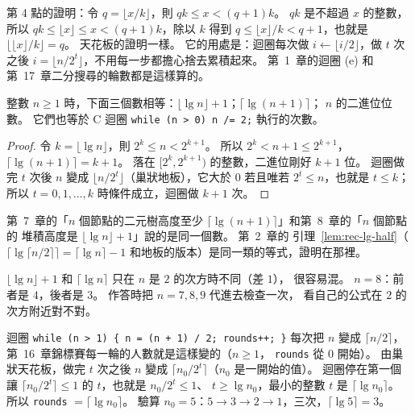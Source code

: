第 4 點的證明：令 $q = \lfloor x / k \rfloor$，則 $qk \le x < (q + 1)k$。 $qk$ 是不超過
$x$ 的整數，所以 $qk \le \lfloor x \rfloor \le x < (q + 1)k$，除以 $k$ 得到
$q \le \lfloor x \rfloor / k < q + 1$，也就是 $\lfloor \lfloor x \rfloor / k \rfloor = q$。
天花板的證明一樣。 它的用處是：迴圈每次做 $i \gets \lfloor i/2 \rfloor$，做 $t$ 次之後
$i = \lfloor n / 2^t \rfloor$，不用每一步都擔心捨去累積起來。 第~1~章的迴圈 (e) 和
第~17~章二分搜尋的輪數都是這樣算的。

\begin{lemma}
\label{lem:mth-bits}
整數 $n \ge 1$ 時，下面三個數相等：$\lfloor \lg n \rfloor + 1$；$\lceil \lg(n + 1) \rceil$；
$n$ 的二進位位數。 它們也等於 C 迴圈 \texttt{while (n > 0) n /= 2;} 執行的次數。
\end{lemma}

\begin{proof}
令 $k = \lfloor \lg n \rfloor$，則 $2^k \le n < 2^{k+1}$。 所以 $2^k < n + 1 \le 2^{k+1}$，
$\lceil \lg(n+1) \rceil = k + 1$。 落在 $[2^k, 2^{k+1})$ 的整數，二進位剛好 $k + 1$ 位。
迴圈做完 $t$ 次後 $n$ 變成 $\lfloor n / 2^t \rfloor$（巢狀地板），它大於 $0$ 若且唯若
$2^t \le n$，也就是 $t \le k$；所以 $t = 0, 1, \ldots, k$ 時條件成立，迴圈做 $k + 1$ 次。
\end{proof}

第~7~章的「$n$ 個節點的二元樹高度至少 $\lceil \lg(n+1) \rceil$」和第~8~章的「$n$ 個節點的
堆積高度是 $\lfloor \lg n \rfloor + 1$」說的是同一個數。 第~2~章的
引理~\ref{lem:rec-lg-half}（$\lceil \lg \lceil n/2 \rceil \rceil = \lceil \lg n \rceil - 1$
和地板的版本）是同一類的等式，證明在那裡。

\begin{examnote}
$\lfloor \lg n \rfloor + 1$ 和 $\lceil \lg n \rceil$ 只在 $n$ 是 $2$ 的次方時不同（差 $1$），
很容易混。 $n = 8$：前者是 $4$，後者是 $3$。 作答時把 $n = 7, 8, 9$ 代進去檢查一次，
看自己的公式在 $2$ 的次方附近對不對。
\end{examnote}

迴圈 \texttt{while (n > 1) \{ n = (n + 1) / 2; rounds++; \}}
每次把 $n$ 變成 $\lceil n/2 \rceil$，第~16~章錦標賽每一輪的人數就是這樣變的（$n \ge 1$，
\texttt{rounds} 從 $0$ 開始）。
由巢狀天花板，做完 $t$ 次之後 $n$ 變成 $\lceil n_0 / 2^t \rceil$（$n_0$ 是一開始的值）。
迴圈停在第一個讓 $\lceil n_0 / 2^t \rceil \le 1$ 的 $t$，也就是 $n_0 / 2^t \le 1$、
$t \ge \lg n_0$，最小的整數 $t$ 是 $\lceil \lg n_0 \rceil$。 所以 \texttt{rounds}
$= \lceil \lg n_0 \rceil$。 驗算 $n_0 = 5$：$5 \to 3 \to 2 \to 1$，三次，$\lceil \lg 5
\rceil = 3$。

